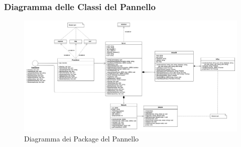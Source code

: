 \subsubsection{Diagramma delle Classi del Pannello}

\begin{landscape}
\begin{figure}[H]
	\begin{center}
		\includegraphics[scale=0.3]{./images/serverClassi.png} 
	\end{center}
	\caption{Diagramma dei Package del Pannello}
\end{figure}
\end{landscape}
